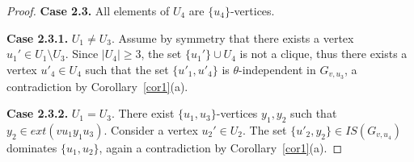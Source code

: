 \documentclass[12pt]{article}
\begin{document}
\begin{proof}
\textbf{Case 2.3.} All elements of $U_4$ are $\{u_4\}$-vertices. 

\textbf{Case 2.3.1.} $U_1 \neq U_3$. Assume by symmetry that there exists a vertex $u_1' \in U_1 \setminus U_3$. Since $|U_4| \geq 3$, the set $\{u_1'\} \cup U_4$ is not a clique, thus there exists a vertex $u'_4 \in U_4$ such that the set $\{u'_1,u'_4\}$ is $\theta$-independent in $G_{v,u_3}$, a contradiction by Corollary~\ref{cor1}(a). 

\textbf{Case 2.3.2.} $U_1 = U_3$. There exist $\{u_1,u_3\}$-vertices $y_1, y_2$ such that $y_2 \in ext(vu_1y_1u_3)$.  Consider a vertex $u_2' \in U_2$.  The set $\{u'_2,y_2\} \in IS(G_{v,u_4})$ dominates $\{u_1,u_2\}$, again a contradiction by Corollary~\ref{cor1}(a).

\end{proof}
\end{document}
